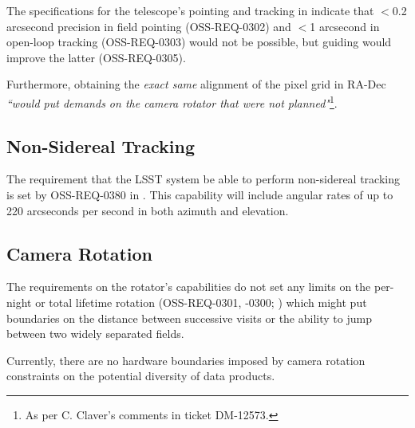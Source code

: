 The specifications for the telescope's pointing and tracking in  indicate 
that $<$0.2 arcsecond precision in field pointing (OSS-REQ-0302) and $<$1 arcsecond in 
open-loop tracking (OSS-REQ-0303) would not be possible, but guiding would improve the 
latter (OSS-REQ-0305).

Furthermore, obtaining the \emph{exact same} alignment of the pixel grid in RA-Dec 
{\it ``would put demands on the camera rotator that were not planned"}\footnote{As per 
C. Claver's comments in ticket DM-12573.}.

\subsection{Non-Sidereal Tracking}

The requirement that the LSST system be able to perform non-sidereal tracking is set by 
OSS-REQ-0380 in . 
This capability will include angular rates of up to 220 arcseconds per second in both 
azimuth and elevation. 

\subsection{Camera Rotation}

The requirements on the rotator's capabilities do not set any limits on the per-night or 
total lifetime rotation (OSS-REQ-0301, -0300; ) which might put boundaries 
on the distance between successive visits or the ability to jump between two widely 
separated fields.

Currently, there are no hardware boundaries imposed by camera rotation constraints on the potential diversity of data products.

